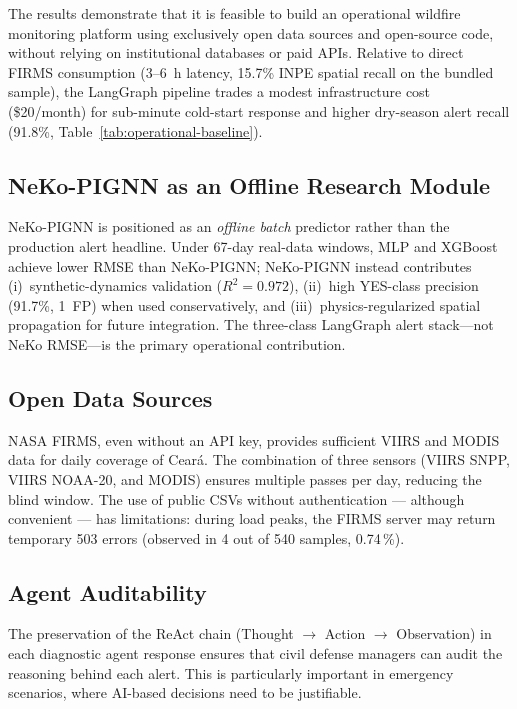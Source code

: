 \documentclass[preprint,12pt,times,numbers]{elsarticle}
\begin{document}
The results demonstrate that it is feasible to build an operational wildfire monitoring platform using exclusively open data sources and open-source code, without relying on institutional databases or paid APIs. Relative to direct FIRMS consumption (3--6~h latency, 15.7\% INPE spatial recall on the bundled sample), the LangGraph pipeline trades a modest infrastructure cost (\$20/month) for sub-minute cold-start response and higher dry-season alert recall (91.8\%, Table~\ref{tab:operational-baseline}).

\subsection{NeKo-PIGNN as an Offline Research Module}

NeKo-PIGNN is positioned as an \emph{offline batch} predictor rather than the production alert headline. Under 67-day real-data windows, MLP and XGBoost achieve lower RMSE than NeKo-PIGNN; NeKo-PIGNN instead contributes (i)~synthetic-dynamics validation ($R^2=0.972$), (ii)~high YES-class precision (91.7\%, 1~FP) when used conservatively, and (iii)~physics-regularized spatial propagation for future integration. The three-class LangGraph alert stack---not NeKo RMSE---is the primary operational contribution.

\subsection{Open Data Sources}

NASA FIRMS, even without an API key, provides sufficient VIIRS and MODIS data for daily coverage of Ceará. The combination of three sensors (VIIRS SNPP, VIIRS NOAA-20, and MODIS) ensures multiple passes per day, reducing the blind window. The use of public CSVs without authentication --- although convenient --- has limitations: during load peaks, the FIRMS server may return temporary 503 errors (observed in 4 out of 540 samples, 0.74\,\%).

\subsection{Agent Auditability}

The preservation of the ReAct chain (Thought $\rightarrow$ Action $\rightarrow$ Observation) in each diagnostic agent response ensures that civil defense managers can audit the reasoning behind each alert. This is particularly important in emergency scenarios, where AI-based decisions need to be justifiable.
\end{document}
